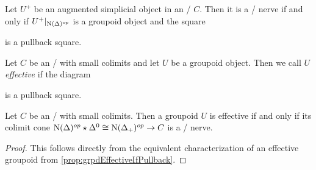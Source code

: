 \begin{prop}\label{prop:grpdEffectiveIfPullback} %
    Let $U^+$ be an augmented simplicial object in an \inftycat/ $C$.
    Then it is a \Cech/ nerve if and only if $U^+|_{\operatorname{N}(\Delta)^{\operatorname{op}}}$ is a groupoid object and the square
    \begin{center}
    \end{center}
    is a pullback square.
\end{prop}
\begin{definition}
    Let $C$ be an \inftycat/ with small colimits and let $U$ be a groupoid object.
    Then we call $U$ \emph{effective} if the diagram 
    \begin{center}
    \end{center}
    is a pullback square.
\end{definition}
\begin{corollary}\label{cor:groupoidEffectiveIffColimCechNerve}
    Let $C$ be an \inftycat/ with small colimits. 
    Then a groupoid $U$ is effective if and only if its colimit cone $\operatorname{N}(\Delta)^{op}\star\Delta^0\cong\operatorname{N}(\Delta_+)^{op}\to C$ is a \Cech/ nerve.
    \begin{proof}
        This follows directly from the equivalent characterization of an effective groupoid from \cref{prop:grpdEffectiveIfPullback}.
    \end{proof}
\end{corollary}
